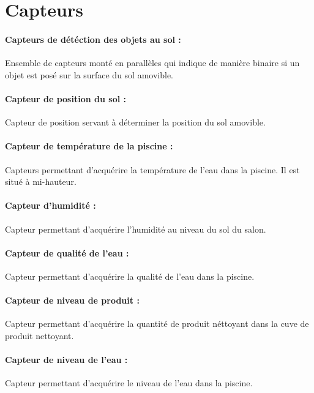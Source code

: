 \documentclass[a4paper,11pt]{article}
\begin{document}
\section{Capteurs}

    \paragraph{Capteurs de détéction des objets au sol :}
        Ensemble de capteurs monté en parallèles qui indique de manière binaire si un objet est posé sur la surface du sol amovible.

    \paragraph{Capteur de position du sol :}
        Capteur de position servant à déterminer la position du sol amovible.

    \paragraph{Capteur de température de la piscine :}
        Capteurs permettant d'acquérire la température de l'eau dans la piscine.
        Il est situé à mi-hauteur.

    \paragraph{Capteur d'humidité :}
        Capteur permettant d'acquérire l'humidité au niveau du sol du salon.

    \paragraph{Capteur de qualité de l'eau :}
        Capteur permettant d'acquérire la qualité de l'eau dans la piscine.

    \paragraph{Capteur de niveau de produit :}
        Capteur permettant d'acquérire la quantité de produit néttoyant dans la cuve de produit nettoyant.

    \paragraph{Capteur de niveau de l'eau :}
	    Capteur permettant d'acquérire le niveau de l'eau dans la piscine.
\end{document}
